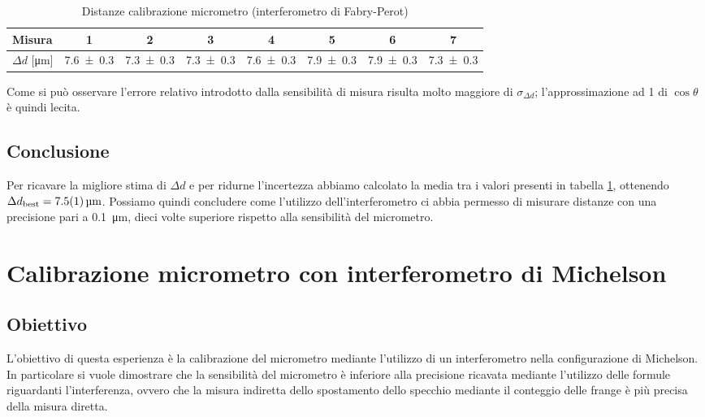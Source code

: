 \documentclass[a4paper]{article}
\begin{document}
\begin{table}[htbp]
\caption{Distanze calibrazione micrometro (interferometro di Fabry-Perot)}
\label{tab:distanze-calibrazione-fabry-perot}
\centering
\begin{tabular}{|l|ccccccc|}
\hline
Misura & 1 & 2 & 3 & 4 & 5 & 6 & 7 \\\hline\hline
$\Delta d$ [\si{\micro\meter}]& \num{7.6 \pm 0.3} & \num{7.3 \pm 0.3} & \num{7.3 \pm 0.3} & \num{7.6 \pm 0.3} & \num{7.9 \pm 0.3} & \num{7.9 \pm 0.3} & \num{7.3 \pm 0.3} \\\hline
\end{tabular}
\end{table}

Come si può osservare l'errore relativo introdotto dalla sensibilità di misura risulta molto maggiore di $\sigma_{\Delta d}$; l'approssimazione ad 1 di $\cos{\theta}$ è quindi lecita.

\subsection{Conclusione}
Per ricavare la migliore stima di $\Delta d$ e per ridurne l'incertezza abbiamo calcolato la media tra i valori presenti in tabella \ref{tab:distanze-calibrazione-fabry-perot}, ottenendo $\Delta d_{\text{best}} = \SI{7.5 \pm 0.1}{\micro\meter}$. Possiamo quindi concludere come l'utilizzo dell'interferometro ci abbia permesso di misurare distanze con una precisione pari a \SI{0.1}{\micro\meter}, dieci volte superiore rispetto alla sensibilità del micrometro.


\section{Calibrazione micrometro con interferometro di Michelson}
\subsection{Obiettivo}
L'obiettivo di questa esperienza è la calibrazione del micrometro mediante l'utilizzo di un interferometro nella configurazione di Michelson. In particolare si vuole dimostrare che la sensibilità del micrometro è inferiore alla precisione ricavata mediante l'utilizzo delle formule riguardanti l'interferenza, ovvero che la misura indiretta dello spostamento dello specchio mediante il conteggio delle frange è più precisa della misura diretta.
\end{document}
